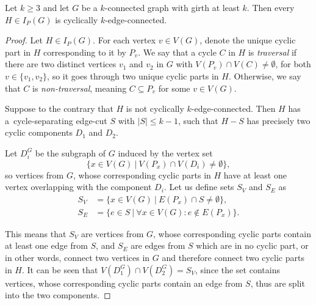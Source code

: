 \documentclass[12pt, twoside]{book}
\begin{document}
\begin{theorem}\label{th:cyclic-part-inflations}
	Let $k\geq 3$ and let $G$ be a $k$-connected graph with girth at least $k$. Then every  $H\in I_P(G)$ is cyclically $k$-edge-connected.
\end{theorem}

\begin{proof}
	Let $H\in I_P(G)$. For each vertex $v\in V(G)$, denote the unique cyclic part in $H$ corresponding to it by $P_v$. We say that a cycle $C$ in $H$ is \textit{traversal} if there are two distinct vertices $v_1$ and $v_2$ in $G$ with $V(P_v)\cap V(C)\neq \emptyset$, for both $v\in\{v_1,v_2\}$, so it goes through two unique cyclic parts in $H$. Otherwise, we say that $C$ is \textit{non-traversal}, meaning $C\subseteq P_v$ for some $v\in V(G)$.
	
	Suppose to the contrary that $H$ is not cyclically $k$-edge-connected. Then $H$ has a~cycle-separating edge-cut $S$ with $|S|\leq k-1$, such that $H-S$ has precisely two cyclic components $D_1$ and $D_2$.
	
	Let $D_i^G$ be the subgraph of $G$ induced by the vertex set $$\{x\in V(G)~|~ V(P_x)\cap V(D_i)\neq \emptyset\},$$ so vertices from $G$, whose corresponding cyclic parts in $H$ have at least one vertex overlapping with the component $D_i$. Let us define sets $S_V$ and $S_E$ as
	\begin{align*}
		S_V &= \{x\in V(G) ~|~ E(P_x)\cap S\neq \emptyset\}, \\
		S_E &= \{e\in S ~|~ \forall x\in V(G): e\notin E(P_x) \}.
	\end{align*}
	
	This means that $S_V$ are vertices from $G$, whose corresponding cyclic parts contain at least one edge from $S$, and $S_E$ are edges from $S$ which are in no cyclic part, or in other words, connect two vertices in $G$ and therefore connect two cyclic parts in $H$. It can be seen that ${V(D_1^G)\cap V(D_2^G)=S_V}$, since the set contains vertices, whose corresponding cyclic parts contain an edge from $S$, thus are split into the two components.
	

\end{proof}
\end{document}
